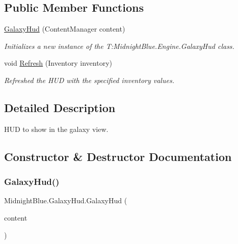 \subsection*{Public Member Functions}
\begin{DoxyCompactItemize}
\item 
\hyperlink{class_midnight_blue_1_1_galaxy_hud_a6f15257e5bc5bbc67cac3888f075ea29}{Galaxy\+Hud} (Content\+Manager content)
\begin{DoxyCompactList}\small\item\em Initializes a new instance of the T\+:\+Midnight\+Blue.\+Engine.\+Galaxy\+Hud class. \end{DoxyCompactList}\item 
void \hyperlink{class_midnight_blue_1_1_galaxy_hud_aea2d04b212188a2e729ea327b7da0449}{Refresh} (Inventory inventory)
\begin{DoxyCompactList}\small\item\em Refreshed the H\+UD with the specified inventory values. \end{DoxyCompactList}\end{DoxyCompactItemize}


\subsection{Detailed Description}
H\+UD to show in the galaxy view. 



\subsection{Constructor \& Destructor Documentation}
\hypertarget{class_midnight_blue_1_1_galaxy_hud_a6f15257e5bc5bbc67cac3888f075ea29}{}\label{class_midnight_blue_1_1_galaxy_hud_a6f15257e5bc5bbc67cac3888f075ea29} 
\subsubsection{\texorpdfstring{Galaxy\+Hud()}{GalaxyHud()}}
{\footnotesize\ttfamily Midnight\+Blue.\+Galaxy\+Hud.\+Galaxy\+Hud (\begin{DoxyParamCaption}\item[{Content\+Manager}]{content }\end{DoxyParamCaption})\hspace{0.3cm}{\ttfamily [inline]}}



